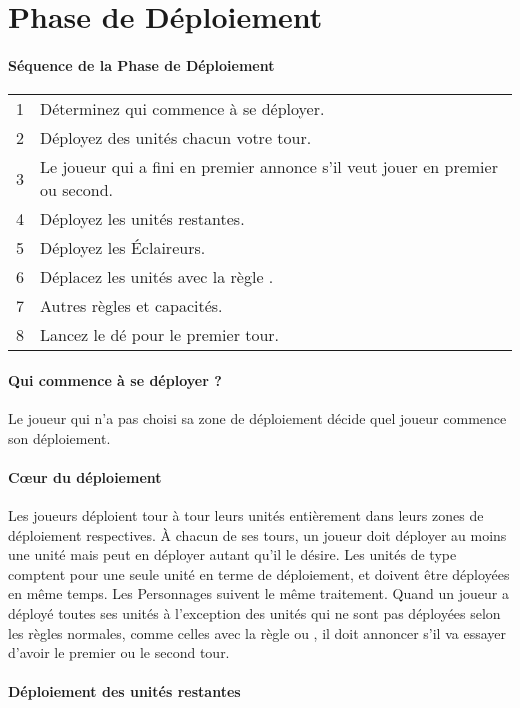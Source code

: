
\hypertarget{deploymentphase}{\part{Phase de Déploiement}}

\subsection{Séquence de la Phase de Déploiement}

\hspace*{0.3cm}
\begin{tabular}{c|m{14cm}}
1 & Déterminez qui commence à se déployer. \tabularnewline
2 & Déployez des unités chacun votre tour. \tabularnewline
3 & Le joueur qui a fini en premier annonce s'il veut jouer en premier ou second. \tabularnewline
4 & Déployez les unités restantes. \tabularnewline
5 & Déployez les Éclaireurs. \tabularnewline
6 & Déplacez les unités avec la règle \vanguard{}. \tabularnewline
7 & Autres règles et capacités. \tabularnewline
8 & Lancez le dé pour le premier tour. \tabularnewline
\end{tabular}

\hypertarget{whodeploysfirst}{\subsection{Qui commence à se déployer ?}}

Le joueur qui n'a pas choisi sa zone de déploiement décide quel joueur commence son déploiement.

\hypertarget{deployingunits}{\subsection{Cœur du déploiement}}

Les joueurs déploient tour à tour leurs unités entièrement dans leurs zones de déploiement respectives. À chacun de ses tours, un joueur doit déployer au moins une unité mais peut en déployer autant  qu'il le désire. Les unités de type \warmachine{} comptent pour une seule unité en terme de déploiement, et doivent être déployées en même temps. Les Personnages suivent le même traitement. Quand un joueur a déployé toutes ses unités à l'exception des unités qui ne sont pas déployées selon les règles normales, comme celles avec la règle \scout{} ou \ambush{}, il doit annoncer s'il va essayer d'avoir le premier ou le second tour.

\hypertarget{deployremainingunits}{\subsection{Déploiement des unités restantes}}

